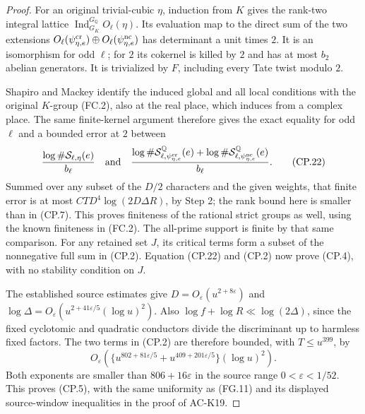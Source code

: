 \begin{proof}
For an original trivial-cubic $\eta$, induction from $K$
gives the rank-two integral lattice
$\operatorname{Ind}_{G_K}^{G_{\mathbb Q}}O_\ell(\eta)$.
Its evaluation map to the direct sum of the two extensions
$O_\ell(\psi_{\eta,e}^{\rm cr})\oplus
 O_\ell(\psi_{\eta,e}^{\rm nc})$ has determinant a unit
times $2$.  It is an isomorphism for odd $\ell$; for $2$
its cokernel is killed by $2$ and has at most $b_2$ abelian
generators.  It is trivialized by $F$, including every Tate
twist modulo $2$.

Shapiro and Mackey identify the induced global and all local
conditions with the original $K$-group (FC.2), also at the
real place, which induces from a complex place.  The same
finite-kernel argument therefore gives the exact equality
for odd $\ell$ and a bounded error at $2$ between
\[
 \frac{\log\#\mathcal S_{\ell,\eta}(e)}{b_\ell}
 \quad\hbox{and}\quad
 \frac{\log\#\mathcal S^{\mathbb Q}_{\ell,
                  \psi_{\eta,e}^{\rm cr}}(e)
       +\log\#\mathcal S^{\mathbb Q}_{\ell,
                  \psi_{\eta,e}^{\rm nc}}(e)}{b_\ell}.            \tag{CP.22}
\]
Summed over any subset of the $D/2$ characters and the given
weights, that finite error is at most
$CTD^4\log(2D\Delta R)$, by Step 2; the rank bound here is
smaller than in (CP.7).  This proves finiteness of the rational
strict groups as well, using the known finiteness in (FC.2).
The all-prime support is finite by that same comparison.
For any retained set $J$, its critical terms form a subset of
the nonnegative full sum in (CP.2).  Equation (CP.22) and
(CP.2) now prove (CP.4), with no stability condition on $J$.

The established source estimates give
$D=O_\varepsilon(u^{2+8\varepsilon})$ and
$\log\Delta=O_\varepsilon(u^{2+41\varepsilon/5}(\log u)^2)$.
Also $\log f+\log R\ll\log(2\Delta)$, since the fixed
cyclotomic and quadratic conductors divide the discriminant
up to harmless fixed factors.  The two terms in (CP.2) are
therefore bounded, with $T\leq u^{399}$, by
\[
 O_\varepsilon\left(
  \{u^{802+81\varepsilon/5}+u^{409+201\varepsilon/5}\}
                                      (\log u)^2\right).
                                                                  \tag{CP.23}
\]
Both exponents are smaller than $806+16\varepsilon$ in the
source range $0<\varepsilon<1/52$.  This proves (CP.5), with
the same uniformity as (FG.11) and its displayed source-window
inequalities in the proof of AC-K19.


\end{proof}
